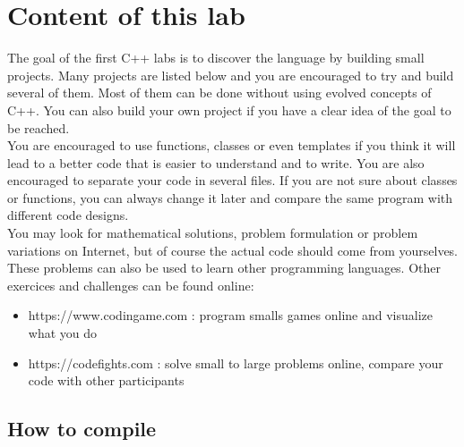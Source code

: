 \documentclass{ecnreport}
\begin{document}


\newcommand{\involves}[1]{
\item {\bf C++ skills:} #1
}

\newcommand{\aitip}[1]{
\item {\bf AI tips:} #1
}


\section{Content of this lab}

The goal of the first C++ labs is to discover the language by building small projects.
Many projects are listed below and you are encouraged to try and build several of them. Most of them can be done without using evolved concepts of C++. You can also build your own project if you have a clear idea of the goal to be reached.\\

You are encouraged to use functions, classes or even templates if you think it will lead to a better code that is easier to understand and to write.
You are also encouraged to separate your code in several files. If you are not sure about classes or functions, you can always change it later and compare
the same program with different code designs.\\

You may look for mathematical solutions, problem formulation or problem variations on Internet, but of course the actual code should come from yourselves. \\

These problems can also be used to learn other programming languages. Other exercices and challenges can be found online:
\begin{itemize}
\item https://www.codingame.com : program smalls games online and visualize what you do
\item https://codefights.com : solve small to large problems online, compare your code with other participants
\end{itemize}

\subsection{How to compile}
\end{document}
